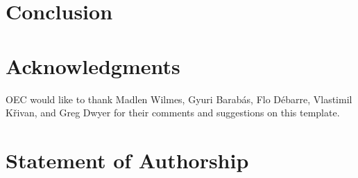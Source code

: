 \documentclass[11pt]{article}
\begin{document}
%

\section*{Conclusion}



\section*{Acknowledgments}

OEC would like to thank Madlen Wilmes, Gyuri Barab\'{a}s, Flo D\'{e}barre, Vlastimil K\v{r}ivan, and Greg Dwyer for their comments and suggestions on this template.


\section*{Statement of Authorship}
\end{document}
